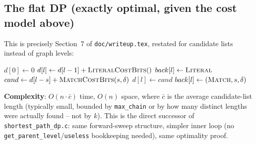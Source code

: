 \documentclass[11pt]{article}
\begin{document}
\subsection{The flat DP (exactly optimal, given the cost model above)}

This is precisely Section~7 of \texttt{doc/writeup.tex}, restated for candidate lists
instead of graph levels:

\begin{algorithm}[H]
\caption{Optimal parse via forward DP}
\begin{algorithmic}[1]
  \State $d[0] \gets 0$
    \State $d[l] \gets d[l-1] + \textsc{LiteralCostBits}()$
    \State $back[l] \gets \textsc{Literal}$
      \State $cand \gets d[l - s] + \textsc{MatchCostBits}(s, \delta)$
        \State $d[l] \gets cand$
        \State $back[l] \gets (\textsc{Match}, s, \delta)$
      \EndIf
    \EndFor
  \EndFor
  \State \Return {}
\EndProcedure
\end{algorithmic}
\end{algorithm}

\textbf{Complexity}: $O(n \cdot \bar{c})$ time, $O(n)$ space, where $\bar{c}$ is the
average candidate-list length (typically small, bounded by \texttt{max\_chain} or by how
many distinct lengths were actually found -- not by $k$). This is the direct successor
of \texttt{shortest\_path\_dp.c}: same forward-sweep structure, simpler inner loop (no
\texttt{get\_parent\_level}/\texttt{useless} bookkeeping needed), same optimality proof.
\end{document}

